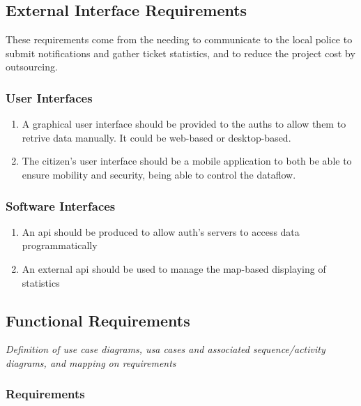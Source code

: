 \documentclass{article}
\newcommand{\enum}[1]{\texttt{#1.\arabic*}}
\begin{document}
	\subsection{External Interface Requirements}
		These requirements come from the needing to communicate to the local police to submit notifications and gather ticket statistics, and to reduce the project cost by outsourcing.
		
		\subsubsection{User Interfaces}
			\begin{enumerate}[label=\enum{UI}]
				\item A graphical user interface should be provided to the auths to allow them to retrive data manually. It could be web-based or desktop-based.
				\item \label{UI_mobileApp}The citizen's user interface should be a mobile application to both be able to ensure mobility and security, being able to control the dataflow.
			\end{enumerate}
			
		\subsubsection{Software Interfaces}
			\begin{enumerate}[label=\enum{SW}]
				\item An api should be produced to allow auth's servers to access data programmatically
				\item An external api should be used to manage the map-based displaying of statistics
			\end{enumerate}
			
	\subsection{Functional Requirements} \textit{Definition of use case diagrams, usa cases and associated sequence/activity diagrams, and mapping on requirements}
			
		\subsubsection{Requirements}
		
\end{document}

